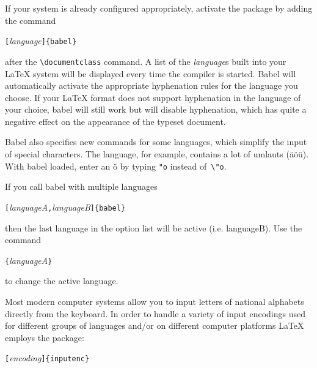 If your system is already configured appropriately, activate
the  package by adding the command
\begin{lscommand}
\verb|[|\emph{language}\verb|]{babel}|
\end{lscommand}
\noindent after the \verb|\documentclass| command. A list of the
\emph{language}s built into your \LaTeX{} system will be displayed
every time the compiler is started. Babel will
automatically activate the appropriate hyphenation rules for the
language you choose. If your \LaTeX{} format does not support
hyphenation in the language of your choice, babel will still work but
will disable hyphenation, which has quite a negative effect on the
appearance of the typeset document.

\textsf{Babel} also specifies new commands for some languages, which
simplify the input of special characters. The  language, for
example, contains a lot of umlauts (\"a\"o\"u).  With \textsf{babel} loaded,
enter an \"o by typing \verb|"o| instead of~\verb|\"o|.

If you call babel with multiple languages
\begin{lscommand}
\verb|[|\emph{languageA}\verb|,|\emph{languageB}\verb|]{babel}| 
\end{lscommand}
\noindent then the last language in the option list will be active (i.e.
languageB). Use the command
\begin{lscommand}
\verb|{|\emph{languageA}\verb|}|
\end{lscommand}
\noindent to change the active language.

\newcommand{\ieih}[1]{%
\index{encodings!input!#1@\texttt{#1}}%
\index{input encodings!#1@\texttt{#1}}%
\index{#1@\texttt{#1}}}
\newcommand{\iei}[1]{%
\ieih{#1}\texttt{#1}}
\newcommand{\feih}[1]{%
\index{encodings!font!#1@\texttt{#1}}%
\index{font encodings!#1@\texttt{#1}}%
\index{#1@\texttt{#1}}}
\newcommand{\fei}[1]{%
\feih{#1}\texttt{#1}}

Most modern computer systems allow you to input letters of
national alphabets  directly from the keyboard. In order to 
handle a variety of input encodings used for different groups of 
languages and/or on different computer platforms \LaTeX{} employs the
 package:
\begin{lscommand}
\verb|[|\emph{encoding}\verb|]{inputenc}|
\end{lscommand}

